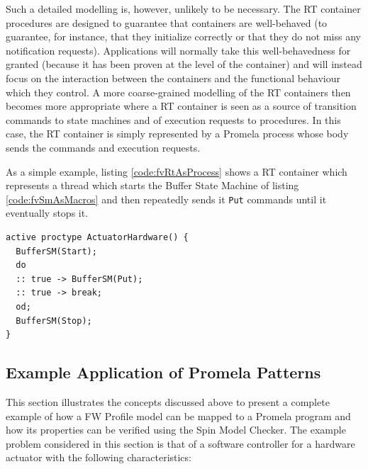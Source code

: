 \documentclass[a4paper,10pt]{article}
\begin{document}
Such a detailed modelling is, however, unlikely to be necessary. The RT container procedures are designed to guarantee that containers are well-behaved (to guarantee, for instance, that they initialize correctly or that they do not miss any notification requests). Applications will normally take this well-behavedness for granted (because it has been proven at the level of the container) and will instead focus on the interaction between the containers and the functional behaviour which they control. A more coarse-grained modelling of the RT containers then becomes more appropriate where a RT container is seen as a source of transition commands to state machines and of execution requests to procedures. In this case, the RT container is simply represented by a Promela process whose body sends the commands and execution requests.

As a simple example, listing \ref{code:fvRtAsProcess} shows a RT container which represents a thread which starts the Buffer State Machine of listing \ref{code:fvSmAsMacros} and then repeatedly sends it \texttt{Put} commands until it eventually stops it. 

\begin{lstlisting}
active proctype ActuatorHardware() {
  BufferSM(Start);
  do
  :: true -> BufferSM(Put);
  :: true -> break;
  od;
  BufferSM(Stop);
} 
\end{lstlisting}

\subsection{Example Application of Promela Patterns}\label{sec:promelaPatternsExample}
This section illustrates the concepts discussed above to present a complete example of how a FW Profile model can be mapped to a Promela program and how its properties can be verified using the Spin Model Checker. The example problem considered in this section is that of a software controller for a hardware actuator with the following characteristics:  
\end{document}
